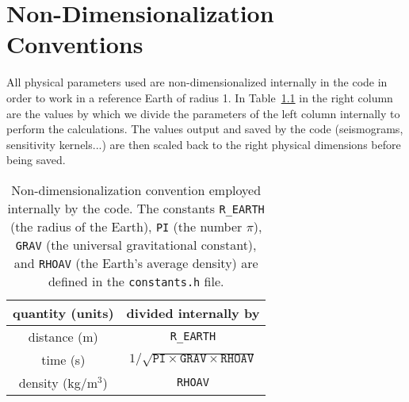\chapter{Non-Dimensionalization Conventions}\label{cha:Non-Dimensionalization-Conventions}

All physical parameters used are non-dimensionalized internally in the code
in order to work in a reference Earth of radius 1. In Table~{\small \ref{table:conventions} in the right column are the values by which
we divide the parameters of the left column internally to perform the calculations.
The values output and saved by the code (seismograms, sensitivity kernels...) are then
scaled back to the right physical dimensions before being saved.
}%
\begin{table}[ht]
\noindent 
\begin{centering}
{\small }\begin{tabular}{|c|c|}
\hline
quantity (units)  & divided internally by \\
\hline
distance (m)  & \texttt{R\_EARTH} \\
time (s)  & $1/\sqrt{\texttt{PI}\times\texttt{GRAV}\times\texttt{RHOAV}}$ \\
density (kg/m$^{3}$)  & \texttt{RHOAV} \\
\hline
\end{tabular}
\par
\end{centering}{\small \par}

\caption{Non-dimensionalization convention employed internally by the code. The constants \texttt{R\_EARTH}
(the radius of the Earth), \texttt{PI} (the number $\pi$), \texttt{GRAV}
(the universal gravitational constant), and \texttt{RHOAV} (the Earth's
average density) are defined in the \texttt{constants.h} file. }

{\small \label{table:conventions} }
\end{table}
{\small \par}


